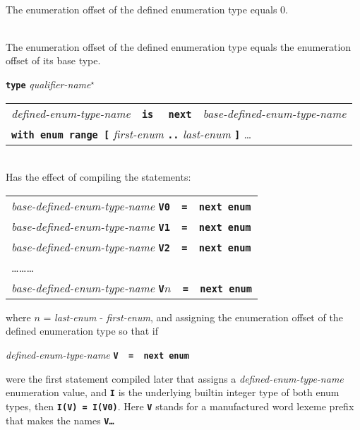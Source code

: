 \documentclass[12pt]{article}
\newcommand{\TT}[1]{{\tt \bfseries #1}}
\newcommand{\STAR}{{\Large $^\star$}}
\newenvironment{indpar}[1][0.3in]%
	{\begin{list}{}%
		     {\setlength{\itemsep}{0in}%
		      \setlength{\topsep}{0in}%
		      \setlength{\parsep}{1ex}%
		      \setlength{\labelwidth}{#1}%
		      \setlength{\leftmargin}{#1}%
		      \addtolength{\leftmargin}{\labelsep}}%
	 \item}%
	{\end{list}}
\newenvironment{itemlist}[1][0.5in]%
	{\begin{list}{}{\setlength{\labelwidth}{#1}%
	                \setlength{\leftmargin}{#1}%
		        \addtolength{\leftmargin}{\labelsep}}}%
	{\end{list}}
\begin{document}
\begin{indpar}
\begin{itemlist}
\item[\TT{type} {\em qualifier-name}\STAR{} {\em defined-enum-type-name}~~%
    \TT{is}~~{\em builtin-integer-type-name} \ldots{}] ~\\
The enumeration offset of the defined enumeration type equals 0.
\item[\TT{type} {\em qualifier-name}\STAR{} {\em defined-enum-type-name}~~%
    \TT{is}~~{\em non-builtin-integer-type-name} \ldots{}] ~\\
The enumeration offset of the defined enumeration type equals
the enumeration offset of its base type.
\item[\TT{type} {\em qualifier-name}\STAR{}]
              \begin{tabular}[t]{@{}l@{}}
              {\em defined-enum-type-name}~~\TT{is}~~%
              \TT{next}~~{\em base-defined-enum-type-name} \\
	      \TT{with enum range [}
	         {\em first-enum} \TT{..} {\em last-enum} \TT{]} \ldots{} \\
	      \end{tabular} \\
Has the effect of compiling the statements:
\begin{center}
\begin{tabular}{l}
{\em base-defined-enum-type-name} \TT{V0~~=~~next enum} \\
{\em base-defined-enum-type-name} \TT{V1~~=~~next enum} \\
{\em base-defined-enum-type-name} \TT{V2~~=~~next enum} \\
\ldots\ldots\ldots \\
{\em base-defined-enum-type-name} \TT{V$n$~~=~~next enum} \\
\end{tabular}
\end{center}
where $n$ = {\em last-enum} - {\em first-enum}, and assigning
the enumeration offset of the defined enumeration type so that if
\begin{center}
{\em defined-enum-type-name} \TT{V~~=~~next enum} \\
\end{center}
were the first statement compiled later that assigns a
{\em defined-enum-type-name} enumeration value,
and \TT{I} is the underlying builtin integer type of both enum
types, then \TT{I(V) = I(V0)}.  Here \TT{V} stands for a manufactured
word lexeme prefix that makes the names \TT{V\ldots}

\end{itemlist}
\end{indpar}
\end{document}
